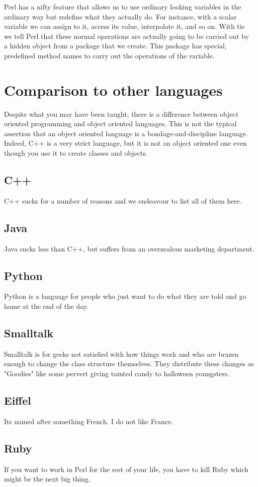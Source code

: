 Perl has a nifty feature that allows us to use ordinary looking 
variables in the ordinary way but redefine what they actually do.
For instance, with a scalar variable we can assign to it, access
its value, interpolate it, and so on.  With tie we tell Perl that
these normal operations are actually going to be carried out by
a hidden object from a package that we create.  This package has 
special, predefined method names to carry out the operations of the
variable.



    \section{Comparison to other languages}

Despite what you may have been taught, there is a difference
between object oriented programming and object oriented languages.
This is not the typical assertion that an object oriented language
is a bondage-and-discipline language.  Indeed, C++ is a very strict 
language, but it is not an object oriented one even though you use
it to create classes and objects.  
 
        \subsection{C++}

C++ sucks for a number of reasons and we endeavour to list all of 
them here.

        \subsection{Java}

Java sucks less than C++, but suffers from an overzealous marketing
department.  

        \subsection{Python}

Python is a language for people who just want to do what they are
told and go home at the end of the day.        
        
        \subsection{Smalltalk}

Smalltalk is for geeks not satisfied with how things work and who
are brazen enough to change the class structure themselves.  They
distribute these changes as "Goodies" like some pervert giving 
tainted candy to halloween youngsters.

        \subsection{Eiffel}

Its named after something French.  I do not like France.

        \subsection{Ruby}

If you want to work in Perl for the rest of your life, you have to
kill Ruby which might be the next big thing.

        
